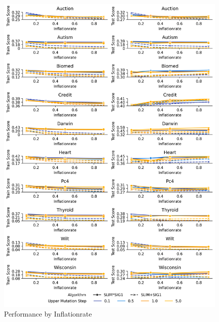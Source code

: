 
    \begin{figure}[H]
    \centering
    \includegraphics[width=\linewidth]{../Latex/Chapters/Figures/Results/inflationrate_performance_by_p_inflate.png}
    \caption{Performance by Inflationrate}
    \label{fig:inflationrate_performance_by_p_inflate}
    \end{figure}
    